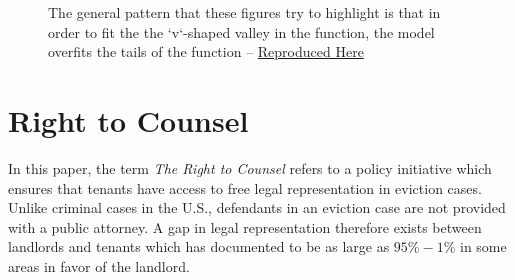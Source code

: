 \documentclass[a4paper,12pt]{article}
\begin{document}
\begin{figure}[htbp]
\begin{subfigure}{.48\textwidth}
\end{subfigure}
\caption{The general pattern that these figures try to highlight is that in order to fit the the `v`-shaped valley in the function, the model overfits the tails of the function -- \href{https://github.com/pharringtonp19/jmp_paper/blob/main/notebooks/gradient_descent_motivating_example.ipynb}{Reproduced Here}}
\end{figure}


\section{Right to Counsel}
In this paper, the term \textit{The Right to Counsel} refers to a policy initiative which ensures that tenants have access to free legal representation in eviction cases. Unlike criminal cases in the U.S., defendants in an eviction case are not provided with a public attorney. A gap in legal representation therefore exists between landlords and tenants which \cite{collinson2022eviction} has documented to be as large as $95\%-1\%$ in some areas in favor of the landlord.
\end{document}
